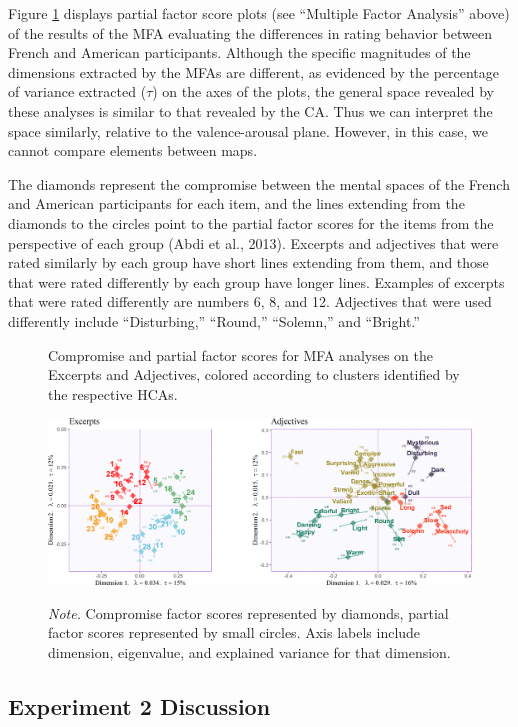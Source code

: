 \documentclass[
  english,
  man,floatsintext]{apa6}
\begin{document}
Figure \ref{fig:mfasbs} displays partial factor score plots (see ``Multiple Factor Analysis'' above) of the results of the MFA evaluating the differences in rating behavior between French and American participants. Although the specific magnitudes of the dimensions extracted by the MFAs are different, as evidenced by the percentage of variance extracted (\(\tau\)) on the axes of the plots, the general space revealed by these analyses is similar to that revealed by the CA. Thus we can interpret the space similarly, relative to the valence-arousal plane. However, in this case, we cannot compare elements between maps.

The diamonds represent the compromise between the mental spaces of the French and American participants for each item, and the lines extending from the diamonds to the circles point to the partial factor scores for the items from the perspective of each group (Abdi et al., 2013). Excerpts and adjectives that were rated similarly by each group have short lines extending from them, and those that were rated differently by each group have longer lines. Examples of excerpts that were rated differently are numbers 6, 8, and 12. Adjectives that were used differently include ``Disturbing,'' ``Round,'' ``Solemn,'' and ``Bright.''

\begin{figure}   
  \centering  
  \caption{Compromise and partial factor scores for MFA analyses on the Excerpts and Adjectives, colored according to clusters identified by the respective HCAs.}
    \includegraphics{./Music-Descriptor-Space_files/figure-latex/mfatogether-1.png}
  \label{fig:mfasbs}
  \caption*{\footnotesize \textit{Note.} Compromise factor scores represented by diamonds, partial factor scores represented by small circles. Axis labels include dimension, eigenvalue, and explained variance for that dimension.}
\end{figure}

\hypertarget{experiment-2-discussion}{%
\subsection{Experiment 2 Discussion}\label{experiment-2-discussion}}
\end{document}
